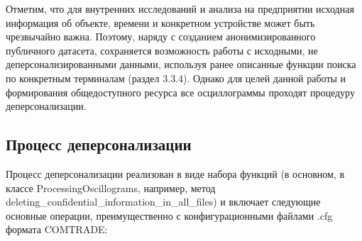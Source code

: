 Отметим, что для внутренних исследований и анализа на предприятии исходная информация об объекте, времени и конкретном устройстве может быть чрезвычайно важна. Поэтому, наряду с созданием анонимизированного публичного датасета, сохраняется возможность работы с исходными, не деперсонализированными данными, используя ранее описанные функции поиска по конкретным терминалам (раздел 3.3.4). Однако для целей данной работы и формирования общедоступного ресурса все осциллограммы проходят процедуру деперсонализации.\par\vspace{0.2cm}

\subsection{Процесс деперсонализации}\label{sec:ch3_depersonalization_process}

Процесс деперсонализации реализован в виде набора функций (в основном, в классе ProcessingOscillograms, например, метод deleting\_\allowbreak confidential\_\allowbreak information\_\allowbreak in\_\allowbreak all\_\allowbreak files) и включает следующие основные операции, преимущественно с конфигурационными файлами .cfg формата COMTRADE:\par\vspace{0.2cm}

